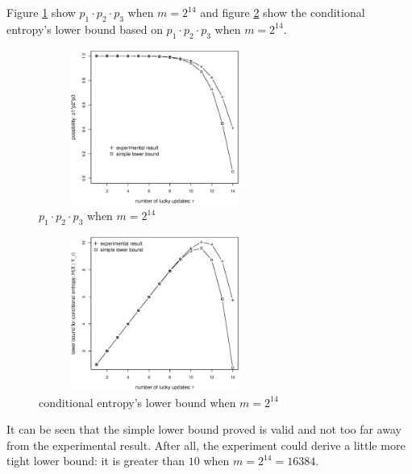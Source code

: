 \documentclass[10pt, conference, compsocconf]{IEEEtran}
\begin{document}
        Figure \ref{p14} show $p_1 \cdot p_2 \cdot p_3$
        when $m = 2^{14}$ and figure \ref{hp14} show the conditional entropy's
        lower bound based on $p_1 \cdot p_2 \cdot p_3$ when $m = 2^{14}$.

%
        \begin{figure}[!t]
        \centering
        \includegraphics[width=3in, height=2in, trim=0mm 0mm 0mm 20mm]{p14.eps}
        \caption{$p_1 \cdot p_2 \cdot p_3$ when $m = 2^{14}$}\label{p14}
        \end{figure}

        \begin{figure}[!t]
        \centering
        \includegraphics[width=3in, height=2in, trim=0mm 0mm 0mm 20mm]{hp14.eps}
        \caption{conditional entropy's lower bound when $m = 2^{14}$}\label{hp14}
        \end{figure}

        It can be seen that the simple lower bound proved is valid and not too
        far away from the experimental result. After all, the experiment could derive
        a little more tight lower bound: it is greater than $10$
        when $m = 2^{14} = 16384$.
\end{document}
